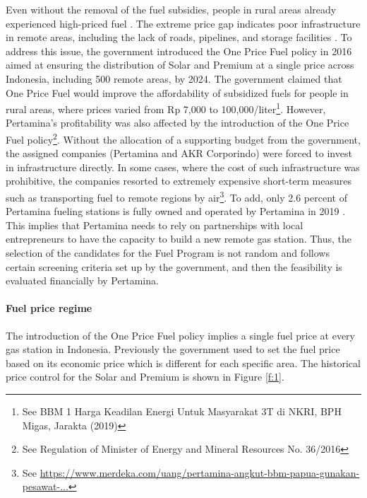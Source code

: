 \documentclass[letterpaper,12pt,leqno]{article}
\begin{document}
Even without the removal of the fuel subsidies, people in rural areas already experienced high-priced fuel \citep{liputan_2016, jawapos_2017}. The extreme price gap indicates poor infrastructure in remote areas, including the lack of roads, pipelines, and storage facilities \citep{ichsan_2021}. To address this issue, the government introduced the One Price Fuel policy in 2016 aimed at ensuring the distribution of Solar and Premium at a single price across Indonesia, including 500 remote areas, by 2024. The government claimed that One Price Fuel would improve the affordability of subsidized fuels for people in rural areas, where prices varied from Rp 7,000 to 100,000/liter\footnote{See BBM 1 Harga Keadilan Energi Untuk Masyarakat 3T di NKRI, BPH Migas, Jarakta (2019)}. However, Pertamina's profitability was also affected by the introduction of the One Price Fuel policy\footnote{See Regulation of Minister of Energy and Mineral Resources No. 36/2016}. Without the allocation of a supporting budget from the government, the assigned companies (Pertamina and AKR Corporindo) were forced to invest in infrastructure directly. In some cases, where the cost of such infrastructure was prohibitive, the companies resorted to extremely expensive short-term measures such as transporting fuel to remote regions by air\footnote{See \href{https://www.merdeka.com/uang/pertamina-angkut-bbm-papua-gunakan-pesawat-kapasitas-4000-liter.html}{https://www.merdeka.com/uang/pertamina-angkut-bbm-papua-gunakan-pesawat-...}}. To add, only 2.6 percent of Pertamina fueling stations is fully owned and operated by Pertamina in 2019 \citep{pertamina_2020}. This implies that Pertamina needs to rely on partnerships with local entrepreneurs to have the capacity to build a new remote gas station. Thus, the selection of the candidates for the Fuel Program is not random and follows certain screening criteria set up by the government, and then the feasibility is evaluated financially by Pertamina.

\paragraph{Fuel price regime} The introduction of the One Price Fuel policy implies a single fuel price at every gas station in Indonesia. Previously the government used to set the fuel price based on its economic price which is different for each specific area. The historical price control for the Solar and Premium is shown in Figure \ref{f:1}.
\end{document}
